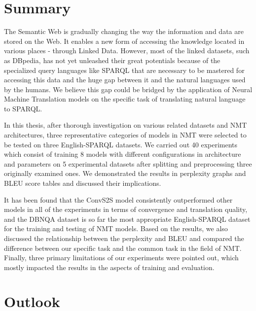 
\section{Summary} \label{section:summary}

The Semantic Web is gradually changing the way the information and data are stored on the Web. It enables a new form of accessing the knowledge located in various places - through Linked Data. However, most of the linked datasets, such as DBpedia, has not yet unleashed their great potentials because of the specialized query languages like SPARQL that are necessary to be mastered for accessing this data and the huge gap between it and the natural languages used by the humans. We believe this gap could be bridged by the application of Neural Machine Translation models on the specific task of translating natural language to SPARQL. 

In this thesis, after thorough investigation on various related datasets and NMT architectures, three representative categories of models in NMT were selected to be tested on three English-SPARQL datasets. We carried out 40 experiments which consist of training 8 models with different configurations in architecture and parameters on 5 experimental datasets after splitting and preprocessing three originally examined ones. We demonstrated the results in perplexity graphs and BLEU score tables and discussed their implications.

It has been found that the ConvS2S model consistently outperformed other models in all of the experiments in terms of convergence and translation quality, and the DBNQA dataset is so far the most appropriate English-SPARQL dataset for the training and testing of NMT models. Based on the results, we also discussed the relationship between the perplexity and BLEU and compared the difference between our specific task and the common task in the field of NMT. Finally, three primary limitations of our experiments were pointed out, which mostly impacted the results in the aspects of training and evaluation.

\section{Outlook} \label{section:outlook}

